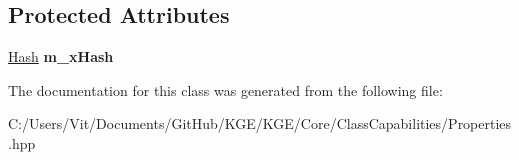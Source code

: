 \subsection*{Protected Attributes}
\begin{DoxyCompactItemize}
\item 
\hypertarget{class_k_g_e_1_1_property_adc5c1288628b419954f24a754aa7662f}{\hyperlink{class_k_g_e_1_1_hash}{Hash} {\bfseries m\-\_\-x\-Hash}}\label{class_k_g_e_1_1_property_adc5c1288628b419954f24a754aa7662f}

\end{DoxyCompactItemize}


The documentation for this class was generated from the following file\-:\begin{DoxyCompactItemize}
\item 
C\-:/\-Users/\-Vit/\-Documents/\-Git\-Hub/\-K\-G\-E/\-K\-G\-E/\-Core/\-Class\-Capabilities/Properties.\-hpp\end{DoxyCompactItemize}
